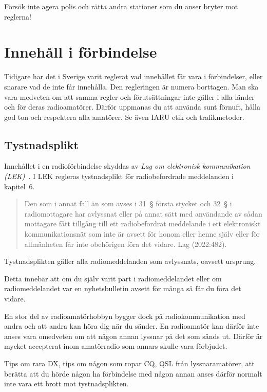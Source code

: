 Försök inte agera polis och rätta andra stationer som du anser bryter mot reglerna!

\section{Innehåll i förbindelse}
\label{innehåll i förbindelse}

Tidigare har det i Sverige varit reglerat vad innehållet får vara i
förbindelser, eller snarare vad de inte får innehålla.
Den regleringen är numera borttagen.
Man ska vara medveten om att samma regler och förutsättningar inte gäller i
alla länder och för deras radioamatörer.
Därför uppmanas du att använda sunt förnuft, hålla god ton och respektera alla
amatörer.
Se även IARU etik och trafikmetoder.

\subsection{Tystnadsplikt}

Innehållet i en radioförbindelse skyddas av
\emph{Lag om elektronisk kommunikation (LEK)}~\cite{SFS2022:482}.
I LEK regleras tystnadsplikt för radiobefordrade meddelanden i kapitel~6.

\begin{quote}
	Den som i annat fall än som avses i 31~\S{} första stycket och 32~\S{} i
	radiomottagare har avlyssnat eller på annat sätt med användande av sådan
	mottagare fått tillgång till ett radiobefordrat meddelande i ett
	elektroniskt kommunikationsnät som inte är avsett för honom eller henne
	själv eller för allmänheten får inte obehörigen föra det vidare.
	Lag (2022:482).\cite[kap 9, \S33]{SFS2022:482}
\end{quote}

Tystnadsplikten gäller alla radiomeddelanden som avlyssnats, oavsett ursprung.

Detta innebär att om du själv varit part i radiomeddelandet eller om
radiomeddelandet var en nyhetsbulletin avsett för många så får du föra det vidare.

En stor del av radioamatörhobbyn bygger dock på radiokommunikation med andra och
att andra kan höra dig när du sänder.
En radioamatör kan därför inte anses vara omedveten om att någon annan lyssnar
på det som sänds ut.
Därför är mycket accepterat inom amatörradio som annars skulle vara förbjudet.

Tips om rara DX, tips om någon som ropar CQ, QSL från lyssnaramatörer, att
berätta att du hörde någon ha förbindelse med någon annan anses därför normalt
inte vara ett brott mot tystnadsplikten.

